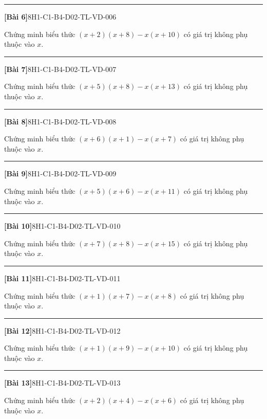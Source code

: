 \documentclass[12pt,a4paper]{article}
\newif\ifloigiai
\newenvironment{cauhoi}[2]{%
  \par\medskip\noindent\rule{\textwidth}{0.4pt}\par\nopagebreak
  \noindent\textbf{[#1]}\hfill{\scriptsize\ttfamily #2}\par\nopagebreak\smallskip}{\par}
\newcommand{\loigiai}[1]{\ifloigiai\par\smallskip\noindent\textit{Lời giải.} #1\par\fi}
\begin{document}
\begin{cauhoi}{Bài 6}{8H1-C1-B4-D02-TL-VD-006}
Chứng minh biểu thức $(x+2)(x+8)-x(x+10)$ có giá trị không phụ thuộc vào $x$.
\loigiai{$(x+2)(x+8)-x(x+10)=x^{2}+2x+8x+16-x^{2}-10x=16$. Kết quả là hằng số nên biểu thức không phụ thuộc vào $x$.}
\end{cauhoi}
\begin{cauhoi}{Bài 7}{8H1-C1-B4-D02-TL-VD-007}
Chứng minh biểu thức $(x+5)(x+8)-x(x+13)$ có giá trị không phụ thuộc vào $x$.
\loigiai{$(x+5)(x+8)-x(x+13)=x^{2}+5x+8x+40-x^{2}-13x=40$. Kết quả là hằng số nên biểu thức không phụ thuộc vào $x$.}
\end{cauhoi}
\begin{cauhoi}{Bài 8}{8H1-C1-B4-D02-TL-VD-008}
Chứng minh biểu thức $(x+6)(x+1)-x(x+7)$ có giá trị không phụ thuộc vào $x$.
\loigiai{$(x+6)(x+1)-x(x+7)=x^{2}+6x+x+6-x^{2}-7x=6$. Kết quả là hằng số nên biểu thức không phụ thuộc vào $x$.}
\end{cauhoi}
\begin{cauhoi}{Bài 9}{8H1-C1-B4-D02-TL-VD-009}
Chứng minh biểu thức $(x+5)(x+6)-x(x+11)$ có giá trị không phụ thuộc vào $x$.
\loigiai{$(x+5)(x+6)-x(x+11)=x^{2}+5x+6x+30-x^{2}-11x=30$. Kết quả là hằng số nên biểu thức không phụ thuộc vào $x$.}
\end{cauhoi}
\begin{cauhoi}{Bài 10}{8H1-C1-B4-D02-TL-VD-010}
Chứng minh biểu thức $(x+7)(x+8)-x(x+15)$ có giá trị không phụ thuộc vào $x$.
\loigiai{$(x+7)(x+8)-x(x+15)=x^{2}+7x+8x+56-x^{2}-15x=56$. Kết quả là hằng số nên biểu thức không phụ thuộc vào $x$.}
\end{cauhoi}
\begin{cauhoi}{Bài 11}{8H1-C1-B4-D02-TL-VD-011}
Chứng minh biểu thức $(x+1)(x+7)-x(x+8)$ có giá trị không phụ thuộc vào $x$.
\loigiai{$(x+1)(x+7)-x(x+8)=x^{2}+x+7x+7-x^{2}-8x=7$. Kết quả là hằng số nên biểu thức không phụ thuộc vào $x$.}
\end{cauhoi}
\begin{cauhoi}{Bài 12}{8H1-C1-B4-D02-TL-VD-012}
Chứng minh biểu thức $(x+1)(x+9)-x(x+10)$ có giá trị không phụ thuộc vào $x$.
\loigiai{$(x+1)(x+9)-x(x+10)=x^{2}+x+9x+9-x^{2}-10x=9$. Kết quả là hằng số nên biểu thức không phụ thuộc vào $x$.}
\end{cauhoi}
\begin{cauhoi}{Bài 13}{8H1-C1-B4-D02-TL-VD-013}
Chứng minh biểu thức $(x+2)(x+4)-x(x+6)$ có giá trị không phụ thuộc vào $x$.
\loigiai{$(x+2)(x+4)-x(x+6)=x^{2}+2x+4x+8-x^{2}-6x=8$. Kết quả là hằng số nên biểu thức không phụ thuộc vào $x$.}
\end{cauhoi}
\end{document}
